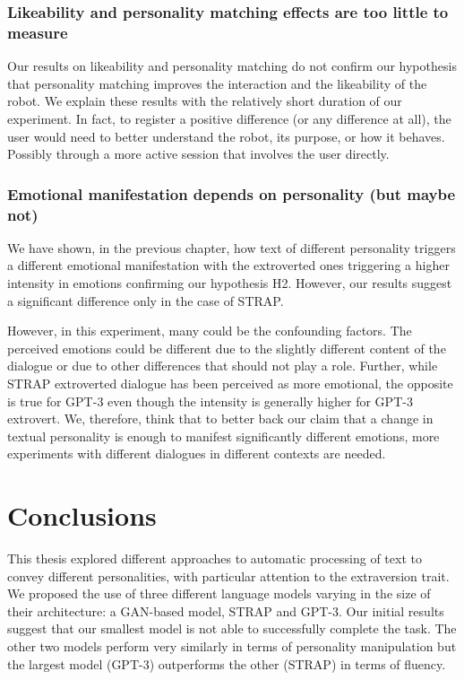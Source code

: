 \documentclass[nomenclature, english, biblatex]{kththesis}
\begin{document}
\subsection{Likeability and personality matching effects are too little to measure}
Our results on likeability and personality matching do not confirm our hypothesis that personality matching improves the interaction and the likeability of the robot. We explain these results with the relatively short duration of our experiment. In fact, to register a positive difference (or any difference at all), the user would need to better understand the robot, its purpose, or how it behaves. Possibly through a more active session that involves the user directly.

\subsection{Emotional manifestation depends on personality (but maybe not)}
We have shown, in the previous chapter, how text of different personality triggers a different emotional manifestation with the extroverted ones triggering a higher intensity in emotions confirming our hypothesis H2. However, our results suggest a significant difference only in the case of STRAP. 

However, in this experiment, many could be the confounding factors. The perceived emotions could be different due to the slightly different content of the dialogue or due to other differences that should not play a role. Further, while STRAP extroverted dialogue has been perceived as more emotional, the opposite is true for GPT-3 even though the intensity is generally higher for GPT-3 extrovert. We, therefore, think that to better back our claim that a change in textual personality is enough to manifest significantly different emotions, more experiments with different dialogues in different contexts are needed.

\chapter{Conclusions}
\label{ch:conclusions}
This thesis explored different approaches to automatic processing of text to convey different personalities, with particular attention to the extraversion trait. We proposed the use of three different language models varying in the size of their architecture: a GAN-based model, STRAP and GPT-3. Our initial results suggest that our smallest model is not able to successfully complete the task. The other two models perform very similarly in terms of personality manipulation but the largest model (GPT-3) outperforms the other (STRAP) in terms of fluency. 
\end{document}
